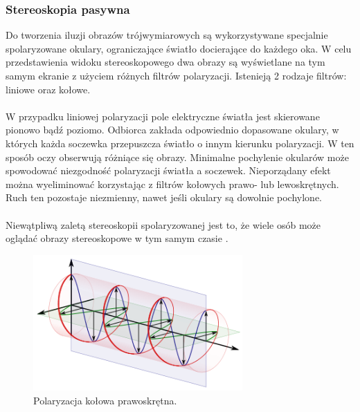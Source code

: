 \subsubsection{Stereoskopia pasywna} 
Do tworzenia iluzji obrazów trójwymiarowych są wykorzystywane specjalnie spolaryzowane okulary, ograniczające światło docierające do każdego oka. W celu przedstawienia widoku stereoskopowego dwa obrazy są wyświetlane na tym samym ekranie z użyciem różnych filtrów polaryzacji. 
Istenieją 2 rodzaje filtrów: liniowe oraz kołowe.\paragraph{} 
W przypadku liniowej polaryzacji pole elektryczne światła jest skierowane pionowo bądź poziomo. Odbiorca zakłada odpowiednio dopasowane okulary, w których każda soczewka przepuszcza światło o innym kierunku polaryzacji. W ten sposób oczy obserwują różniące się obrazy. Minimalne pochylenie okularów może spowodować niezgodność polaryzacji światła a soczewek. Nieporządany efekt można wyeliminować korzystając z filtrów kołowych prawo- lub lewoskrętnych. Ruch ten pozostaje niezmienny, nawet jeśli okulary są dowolnie pochylone.\paragraph{} 
Niewątpliwą zaletą stereoskopii spolaryzowanej jest to, że wiele osób może oglądać obrazy stereoskopowe w tym samym czasie \cite{russianpage}.
\begin{figure}[H]
		\centering
 		\includegraphics[width=8cm]{circular.png}
    	\caption{Polaryzacja kołowa prawoskrętna.}
 		\label{rys3}
\end{figure}

